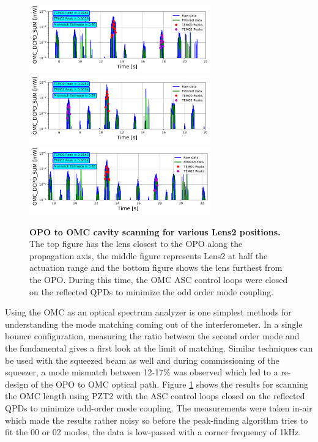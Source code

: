 	\begin{figure}[]
	\centering
	\includegraphics[width=0.7\textwidth]{../Figures/Lens_Closest_to_OPO.png}
	\includegraphics[width=0.7\textwidth]{../Figures/Lens_in_Center_Position.png}
	\includegraphics[width=0.7\textwidth]{../Figures/Lens_Furthest_from_OPO.png}
	\caption[OPO to OMC cavity scanning for various Lens2 positions.]  
	{\textbf{OPO to OMC cavity scanning for various Lens2 positions.}  The top figure has the lens closest to the OPO along the propagation axis, the middle figure represents Lens2 at half the actuation range and the bottom figure shows the lens furthest from the OPO.  During this time, the OMC ASC control loops were closed on the reflected QPDs to minimize the odd order mode coupling.  
	}
	\label{fig:OPO_to_OMC_scan}
	\end{figure}

	Using the OMC as an optical spectrum analyzer is one simplest methods for understanding the mode matching coming out of the interferometer.  In a single bounce configuration, measuring the ratio between the second order mode and the fundamental gives a first look at the limit of matching.  Similar techniques can be used with the squeezed beam as well and during commissioning of the squeezer, a mode mismatch between 12-17\% was observed which led to a re-design of the OPO to OMC optical path.  Figure \ref{fig:OPO_to_OMC_scan} shows the results for scanning the OMC length using PZT2 with the  ASC control loops closed on the reflected QPDs to minimize odd-order mode coupling.  The measurements were taken in-air which made the results rather noisy so before the peak-finding algorithm tries to fit the 00 or 02 modes, the data is low-passed with a corner frequency of 1kHz.
	
